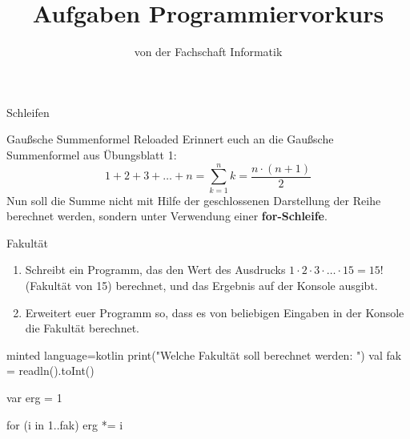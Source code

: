 
\title{Aufgaben Programmiervorkurs}
\subtitle{von der Fachschaft Informatik\hfill\ptitle}

\maketitle{}

\begin{task}[points=auto]{Schleifen}
    \begin{subtask*}[points=0]{Gaußsche Summenformel Reloaded }
        Erinnert euch an die Gaußsche Summenformel aus Übungsblatt 1:
        $$1+2+3+\ldots+n = \sum_{k=1}^nk=\frac{n\cdot(n+1)}{2}$$
        Nun soll die Summe nicht mit Hilfe der geschlossenen Darstellung der Reihe berechnet werden, sondern unter Verwendung einer \textbf{for-Schleife}.

        \begin{solution}
        \end{solution}
    \end{subtask*}
    \begin{subtask*}[points=0]{Fakultät }
        \begin{enumerate}
            \item Schreibt ein Programm, das den Wert des Ausdrucks $1   \cdot \ldots {} = 15!$ (Fakultät von 15) berechnet, und das Ergebnis auf der Konsole ausgibt.
            \item Erweitert euer Programm so, dass es von beliebigen Eingaben in der Konsole die Fakultät berechnet.
        \end{enumerate}

        \begin{solution}
            \begin{codeBlock}[]{minted language=kotlin}
            print("Welche Fakultät soll berechnet werden: ")
            val fak = readln().toInt()

            var erg = 1

            for (i in 1..fak) {
                erg *= i
            }


\end{codeBlock}
\end{solution}
\end{subtask*}
\end{task}
